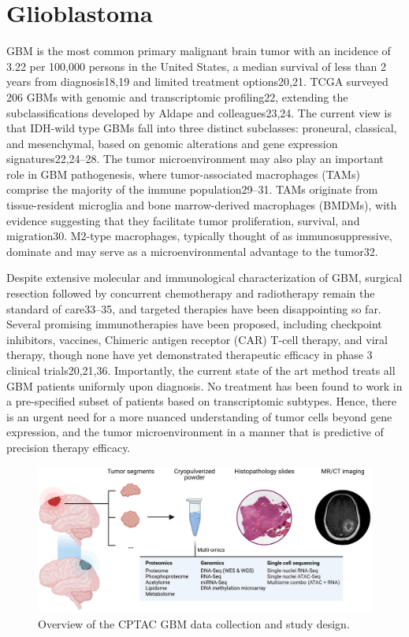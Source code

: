 \section{Glioblastoma}
GBM is the most common primary malignant brain tumor with an incidence of 3.22 per 100,000 persons in the United States, a median survival of less than 2 years from diagnosis18,19 and limited treatment options20,21. TCGA surveyed 206 GBMs with genomic and transcriptomic profiling22, extending the subclassifications developed by Aldape and colleagues23,24. The current view is that IDH-wild type GBMs fall into three distinct subclasses: proneural, classical, and mesenchymal, based on genomic alterations and gene expression signatures22,24–28. The tumor microenvironment may also play an important role in GBM pathogenesis, where tumor-associated macrophages (TAMs) comprise the majority of the immune population29–31. TAMs originate from tissue-resident microglia and bone marrow-derived macrophages (BMDMs), with evidence suggesting that they facilitate tumor proliferation, survival, and migration30. M2-type macrophages, typically thought of as immunosuppressive, dominate and may serve as a microenvironmental advantage to the tumor32.

Despite extensive molecular and immunological characterization of GBM, surgical resection followed by concurrent chemotherapy and radiotherapy remain the standard of care33–35, and targeted therapies have been disappointing so far. Several promising immunotherapies have been proposed, including checkpoint inhibitors, vaccines, Chimeric antigen receptor (CAR) T-cell therapy, and viral therapy, though none have yet demonstrated therapeutic efficacy in phase 3 clinical trials20,21,36. Importantly, the current state of the art method treats all GBM patients uniformly upon diagnosis. No treatment has been found to work in a pre-specified subset of patients based on transcriptomic subtypes. Hence, there is an urgent need for a more nuanced understanding of tumor cells beyond gene expression, and the tumor microenvironment in a manner that is predictive of precision therapy efficacy.

\begin{figure}[tb]
    \centering
    \includegraphics[width=1\linewidth]{figures/chap01_intro/cptac_gbm_multi-omics.png}
    \caption[Overview of the CPTAC GBM data collection and study design.]{%
        Overview of the CPTAC GBM data collection and study design.
    }
    \label{fig:intro-cptac-gbm-study-design}
\end{figure}



